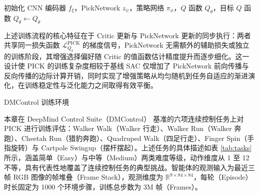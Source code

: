 \begin{algorithm}[htbp]
    \SetAlgoLined
    初始化 CNN 编码器 $f_\xi$，PickNetwork $z_\psi$，策略网络 $\pi_\phi$，$Q$ 函数 $Q_\theta$，目标 $Q$ 函数 $Q_{\bar{\theta}} \leftarrow Q_\theta$\;
    \caption{PICK 视觉 Actor-Critic 算法}
    \label{alg:pick}
\end{algorithm}

上述训练流程的核心特征在于 Critic 更新与 PickNetwork 更新的同步执行：两者共享同一损失函数 $\mathcal{L}_{Q_a}^{\text{PICK}}$ 的梯度信号，PickNetwork 无需额外的辅助损失或独立的训练阶段，其增强选择偏好随 Critic 的值函数估计精度提升而逐步细化。这一设计使 PICK 的训练复杂度相较于基线 SAC 仅增加了 PickNetwork 前向传播与反向传播的边际计算开销，同时实现了增强策略从均匀随机到任务自适应的渐进演化，在训练稳定性与泛化能力之间取得有效平衡。



DMControl 训练环境

本章在 DeepMind Control Suite（DMControl）\cite{tassa2018deepmind} 基准的六项连续控制任务上对 PICK 进行训练评估：Walker Walk（Walker 行走）、Walker Run（Walker 奔跑）、Cheetah Run（猎豹奔跑）、Quadruped Walk（四足行走）、Finger Spin（手指旋转）与 Cartpole Swingup（摆杆摆起）。上述任务的具体描述如表 \ref{tab:tasks} 所示，涵盖简单（Easy）与中等（Medium）两类难度等级，动作维度从 1 至 12 不等，具有代表性地覆盖了连续控制任务的典型挑战。智能体的观测输入为最近三帧 RGB 图像的帧堆叠（Frame Stack），观测维度为 $\mathbb{R}^{9 \times 84 \times 84}$，每轮（Episode）时长固定为 1000 个环境步骤，训练总步数为 3M 帧（Frames）。

